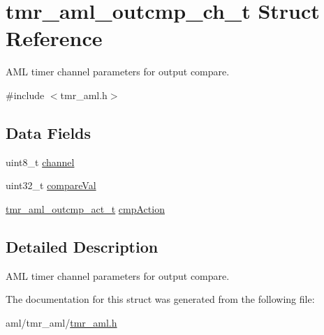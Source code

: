 \hypertarget{structtmr__aml__outcmp__ch__t}{}\section{tmr\+\_\+aml\+\_\+outcmp\+\_\+ch\+\_\+t Struct Reference}
\label{structtmr__aml__outcmp__ch__t}


A\+ML timer channel parameters for output compare.  




{\ttfamily \#include $<$tmr\+\_\+aml.\+h$>$}

\subsection*{Data Fields}
\begin{DoxyCompactItemize}
\item 
uint8\+\_\+t \mbox{\hyperlink{group__globals__group_ga715f5cb061d11eb75981741eda4dafcd}{channel}}
\item 
uint32\+\_\+t \mbox{\hyperlink{group__globals__group_gad34053d0dd1f608826c1afdf92427692}{compare\+Val}}
\item 
\mbox{\hyperlink{group__enum__group_ga50dbf45b245f7b30d865189716b25db5}{tmr\+\_\+aml\+\_\+outcmp\+\_\+act\+\_\+t}} \mbox{\hyperlink{group__globals__group_gaba939de9e86521e98f097d6a761f5b59}{cmp\+Action}}
\end{DoxyCompactItemize}


\subsection{Detailed Description}
A\+ML timer channel parameters for output compare. 

The documentation for this struct was generated from the following file\+:\begin{DoxyCompactItemize}
\item 
aml/tmr\+\_\+aml/\mbox{\hyperlink{tmr__aml_8h}{tmr\+\_\+aml.\+h}}\end{DoxyCompactItemize}
